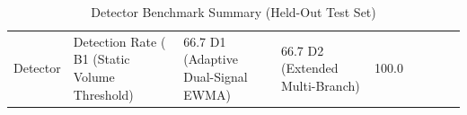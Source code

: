 \begin{table}
\caption{Detector Benchmark Summary (Held-Out Test Set)}
\label{tab:t2}
\begin{tabular}{lllllllll}
\toprule
Detector & Detection Rate (%
\midrule
B1 (Static Volume Threshold) & 66.7%
D1 (Adaptive Dual-Signal EWMA) & 66.7%
D2 (Extended Multi-Branch) & 100.0%
\bottomrule
\end{tabular}
\end{table}

